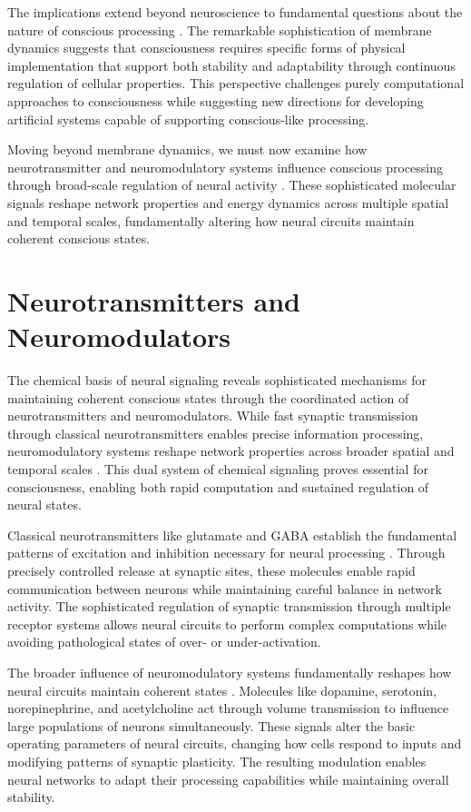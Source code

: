 \begin{refsection}
The implications extend beyond neuroscience to fundamental questions about the nature of conscious processing \cite{Zimmerberg2006}. The remarkable sophistication of membrane dynamics suggests that consciousness requires specific forms of physical implementation that support both stability and adaptability through continuous regulation of cellular properties. This perspective challenges purely computational approaches to consciousness while suggesting new directions for developing artificial systems capable of supporting conscious-like processing.

Moving beyond membrane dynamics, we must now examine how neurotransmitter and neuromodulatory systems influence conscious processing through broad-scale regulation of neural activity \cite{Choquet2013}. These sophisticated molecular signals reshape network properties and energy dynamics across multiple spatial and temporal scales, fundamentally altering how neural circuits maintain coherent conscious states.

\section{Neurotransmitters and Neuromodulators}

The chemical basis of neural signaling reveals sophisticated mechanisms for maintaining coherent conscious states through the coordinated action of neurotransmitters and neuromodulators. While fast synaptic transmission through classical neurotransmitters enables precise information processing, neuromodulatory systems reshape network properties across broader spatial and temporal scales \cite{Nadim2014}. This dual system of chemical signaling proves essential for consciousness, enabling both rapid computation and sustained regulation of neural states.

Classical neurotransmitters like glutamate and GABA establish the fundamental patterns of excitation and inhibition necessary for neural processing \cite{Froemke2015}. Through precisely controlled release at synaptic sites, these molecules enable rapid communication between neurons while maintaining careful balance in network activity. The sophisticated regulation of synaptic transmission through multiple receptor systems allows neural circuits to perform complex computations while avoiding pathological states of over- or under-activation.

The broader influence of neuromodulatory systems fundamentally reshapes how neural circuits maintain coherent states \cite{Marder2012}. Molecules like dopamine, serotonin, norepinephrine, and acetylcholine act through volume transmission to influence large populations of neurons simultaneously. These signals alter the basic operating parameters of neural circuits, changing how cells respond to inputs and modifying patterns of synaptic plasticity. The resulting modulation enables neural networks to adapt their processing capabilities while maintaining overall stability.


\end{refsection}
